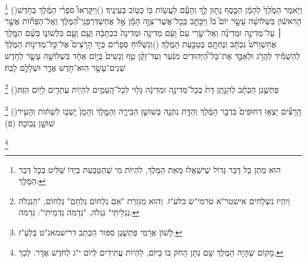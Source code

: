 \documentclass[12pt, openany]{book}
\newcommand{\footnotecomment}[1]{
	\renewcommand\thefootnote{}
	\footnote{\textsf{#1}}}
\newcommand{\commenta}[1]{\footnotecomment{#1}\hspace{0em}}
\newcommand{\vsnum}[1]{(\hebrewnumeral{#1})\space}
\begin{document}
\begin{multicols}{2}
\commenta{ הוּא מַתַּן כָּל דָּבָר גָּדוֹל שֶׁיִּשְׁאֲלוּ מֵאֵת הַמֶּלֶךְ, לִהְיוֹת מִי שֶׁהַטַּבַּעַת בְּיָדוֹ שַׁלִּיט בְּכָל דְּבַר הַמֶּלֶךְ: }%
\vsnum{11}וַיֹּ֤אמֶר הַמֶּ֙לֶךְ֙ לְהָמָ֔ן הַכֶּ֖סֶף נָת֣וּן לָ֑ךְ וְהָעָ֕ם לַעֲשׂ֥וֹת בּ֖וֹ כַּטּ֥וֹב בְּעֵינֶֽיךָ׃
\vsnum{12}וַיִּקָּרְאוּ֩ סֹפְרֵ֨י הַמֶּ֜לֶךְ בַּחֹ֣דֶשׁ הָרִאשׁ֗וֹן בִּשְׁלוֹשָׁ֨ה עָשָׂ֣ר יוֹם֮ בּוֹ֒ וַיִּכָּתֵ֣ב כְּֽכָל־אֲשֶׁר־צִוָּ֣ה הָמָ֡ן אֶ֣ל אֲחַשְׁדַּרְפְּנֵֽי־הַ֠מֶּלֶךְ וְֽאֶל־הַפַּח֞וֹת אֲשֶׁ֣ר ׀ עַל־מְדִינָ֣ה וּמְדִינָ֗ה וְאֶל־שָׂ֤רֵי עַם֙ וָעָ֔ם מְדִינָ֤ה וּמְדִינָה֙ כִּכְתָבָ֔הּ וְעַ֥ם וָעָ֖ם כִּלְשׁוֹנ֑וֹ בְּשֵׁ֨ם הַמֶּ֤לֶךְ אֲחַשְׁוֵרֹשׁ֙ נִכְתָּ֔ב וְנֶחְתָּ֖ם בְּטַבַּ֥עַת הַמֶּֽלֶךְ׃
\vsnum{13}וְנִשְׁל֨וֹחַ סְפָרִ֜ים בְּיַ֣ד הָרָצִים֮ אֶל־כָּל־מְדִינ֣וֹת הַמֶּלֶךְ֒ לְהַשְׁמִ֡יד לַהֲרֹ֣ג וּלְאַבֵּ֣ד אֶת־כָּל־הַ֠יְּהוּדִים מִנַּ֨עַר וְעַד־זָקֵ֜ן טַ֤ף וְנָשִׁים֙ בְּי֣וֹם אֶחָ֔ד בִּשְׁלוֹשָׁ֥ה עָשָׂ֛ר לְחֹ֥דֶשׁ שְׁנֵים־עָשָׂ֖ר הוּא־חֹ֣דֶשׁ אֲדָ֑ר וּשְׁלָלָ֖ם לָבֽוֹז׃%
\commenta{ וְיִהְיוּ נִשְׁלָחִים אישטר"א טרמי"ש בלע"ז. וְהוּא מִגִּזְרַת "אִם נִלְחוֹם נִלְחַם" נִלְחוֹם, "הַנִגְלֹה נִגְלֵיתִי" נִגְלֹה, "נִדְמֹה נִדְמֵיתִי": נִדְמֹה: }%
\vsnum{14}פַּתְשֶׁ֣גֶן הַכְּתָ֗ב לְהִנָּ֤תֵֽן דָּת֙ בְּכָל־מְדִינָ֣ה וּמְדִינָ֔ה גָּל֖וּי לְכָל־הָֽעַמִּ֑ים לִהְי֥וֹת עֲתִדִ֖ים לַיּ֥וֹם הַזֶּֽה׃%
\commenta{ לָשׁוֹן אֲרַמִּי פַּתְשֶׁגֶן סִפּוּר הַכְּתָב דרישמאנ"ט בְּלַעַ"ז: }%
\vsnum{15}הָֽרָצִ֞ים יָצְא֤וּ דְחוּפִים֙ בִּדְבַ֣ר הַמֶּ֔לֶךְ וְהַדָּ֥ת נִתְּנָ֖ה בְּשׁוּשַׁ֣ן הַבִּירָ֑ה וְהַמֶּ֤לֶךְ וְהָמָן֙ יָשְׁב֣וּ לִשְׁתּ֔וֹת וְהָעִ֥יר שׁוּשָׁ֖ן נָבֽוֹכָה׃ (פ)%
\commenta{ מָקוֹם שֶׁהָיָה הַמֶּלֶךְ שָׁם נִתַּן הַחֹק בּוֹ בַיּוֹם, לִהְיוֹת עֲתִידִים לְיוֹם י"ג לְחֹדֶשׁ אֲדָר. לְכַךְ, }%
\end{multicols}\newpage
\end{document}
